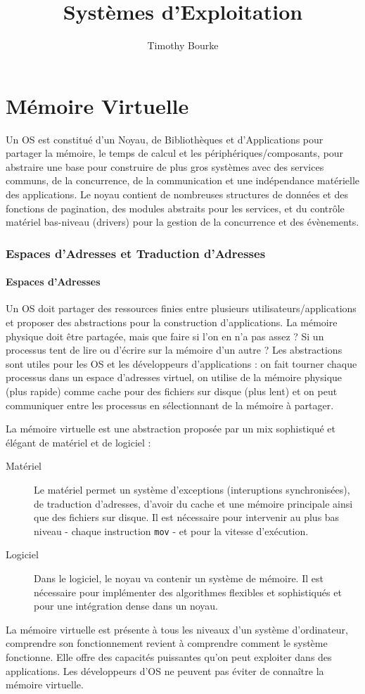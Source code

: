 \documentclass{cours}
\title{Systèmes d'Exploitation}
\author{Timothy Bourke}
\begin{document}
\part{Mémoire Virtuelle}
Un OS est constitué d'un Noyau, de Bibliothèques et d'Applications pour partager la mémoire, le temps de calcul et les périphériques/composants, pour abstraire une base pour construire de plus gros systèmes avec des services communs, de la concurrence, de la communication et une indépendance matérielle des applications. 
Le noyau contient de nombreuses structures de données et des fonctions de pagination, des modules abstraits pour les services, et du contrôle matériel bas-niveau (drivers) pour la gestion de la concurrence et des évènements. 

\section{Espaces d'Adresses et Traduction d'Adresses}
\subsection{Espaces d'Adresses}
Un OS doit partager des ressources finies entre plusieurs utilisateurs/applications et proposer des abstractions pour la construction d'applications. 
La mémoire physique doit être partagée, mais que faire si l'on en n'a pas assez ? Si un processus tent de lire ou d'écrire sur la mémoire d'un autre ? 
Les abstractions sont utiles pour les OS et les développeurs d'applications : on fait tourner chaque processus dans un espace d'adresses virtuel, on utilise de la mémoire physique (plus rapide) comme cache pour des fichiers sur disque (plus lent) et on peut communiquer entre les processus en sélectionnant de la mémoire à partager. 

La mémoire virtuelle est une abstraction proposée par un mix sophistiqué et élégant de matériel et de logiciel : 
\begin{description}
    \item[Matériel] Le matériel permet un système d'exceptions (interuptions synchronisées), de traduction d'adresses, d'avoir du cache et une mémoire principale ainsi que des fichiers sur disque. 
    Il est nécessaire pour intervenir au plus bas niveau - chaque instruction {\tt mov} - et pour la vitesse d'exécution.
    \item[Logiciel] Dans le logiciel, le noyau va contenir un système de mémoire.  
    Il est nécessaire pour implémenter des algorithmes flexibles et sophistiqués et pour une intégration dense dans un noyau. 
\end{description}
La mémoire virtuelle est présente à tous les niveaux d'un système d'ordinateur, comprendre son fonctionnement revient à comprendre comment le système fonctionne. Elle offre des capacités puissantes qu'on peut exploiter dans des applications. Les développeurs d'OS ne peuvent pas éviter de connaître la mémoire virtuelle. 
\end{document}
